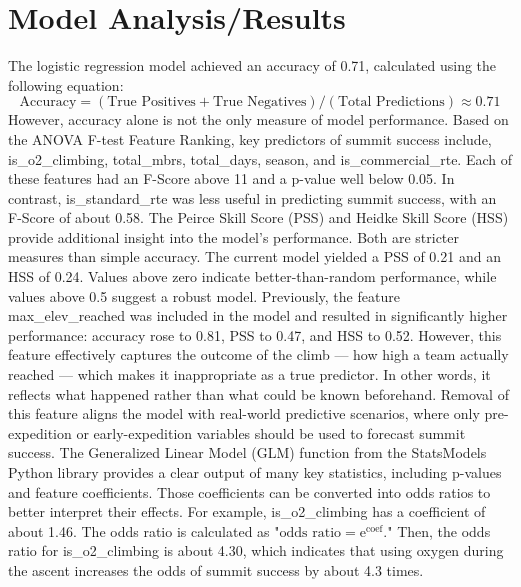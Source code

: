 \documentclass[stu,12pt,floatsintext]{apa7}
\begin{document}
\pagebreak

\section{Model Analysis/Results}
The logistic regression model achieved an accuracy of 0.71, calculated using the following equation: $$\text{Accuracy} = (\text{True Positives} + \text{True Negatives}) / (\text{Total Predictions}) \approx 0.71$$ However, accuracy alone is not the only measure of model performance.
Based on the ANOVA F-test Feature Ranking, key predictors of summit success include, is\_o2\_climbing, total\_mbrs, total\_days, season, and is\_commercial\_rte. Each of these features had an F-Score above 11 and a p-value well below 0.05. 
In contrast, is\_standard\_rte was less useful in predicting summit success, with an F-Score of about 0.58.
The Peirce Skill Score (PSS) and Heidke Skill Score (HSS) provide additional insight into the model's performance. Both are stricter measures than simple accuracy. The current model yielded a PSS of 0.21 and an HSS of 0.24. Values above zero indicate better-than-random performance, while values above 0.5 suggest a robust model.
Previously, the feature max\_elev\_reached was included in the model and resulted in significantly higher performance: accuracy rose to 0.81, PSS to 0.47, and HSS to 0.52. However, this feature effectively captures the outcome of the climb — how high a team actually reached — which makes it inappropriate as a true predictor. In other words, it reflects what happened rather than what could be known beforehand. Removal of this feature aligns the model with real-world predictive scenarios, where only pre-expedition or early-expedition variables should be used to forecast summit success.
The Generalized Linear Model (GLM) function from the StatsModels Python library provides a clear output of many key statistics, including p-values and feature coefficients. Those coefficients can be converted into odds ratios to better interpret their effects. For example, is\_o2\_climbing has a coefficient of about 1.46. The odds ratio is calculated as "$\text{odds ratio} = \text{e}^{\text{coef}}$." Then, the odds ratio for is\_o2\_climbing is about 4.30, which indicates that using oxygen during the ascent increases the odds of summit success by about 4.3 times.

\end{document}
